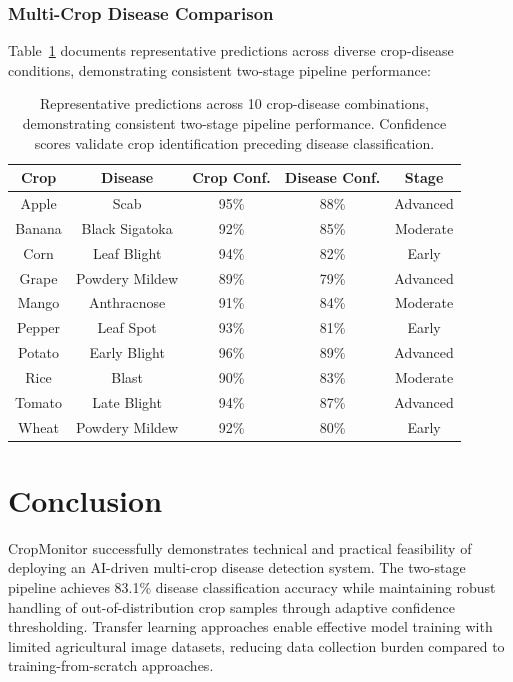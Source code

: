 \documentclass[conference]{IEEEtran}
\begin{document}
\subsubsection{Multi-Crop Disease Comparison}

Table~\ref{tab:visual_examples} documents representative predictions across diverse crop-disease conditions, demonstrating consistent two-stage pipeline performance:

\begin{table}[H]
\centering
\renewcommand{\arraystretch}{1.4}
\begin{tabular}{|c|c|c|c|c|}
\hline
\textbf{Crop} & \textbf{Disease} & \textbf{Crop Conf.} & \textbf{Disease Conf.} & \textbf{Stage} \\
\hline
Apple & Scab & 95\% & 88\% & Advanced \\
Banana & Black Sigatoka & 92\% & 85\% & Moderate \\
Corn & Leaf Blight & 94\% & 82\% & Early \\
Grape & Powdery Mildew & 89\% & 79\% & Advanced \\
Mango & Anthracnose & 91\% & 84\% & Moderate \\
Pepper & Leaf Spot & 93\% & 81\% & Early \\
Potato & Early Blight & 96\% & 89\% & Advanced \\
Rice & Blast & 90\% & 83\% & Moderate \\
Tomato & Late Blight & 94\% & 87\% & Advanced \\
Wheat & Powdery Mildew & 92\% & 80\% & Early \\
\hline
\end{tabular}
\caption{Representative predictions across 10 crop-disease combinations, demonstrating consistent two-stage pipeline performance. Confidence scores validate crop identification preceding disease classification.}
\label{tab:visual_examples}
\end{table}

\section{Conclusion}

CropMonitor successfully demonstrates technical and practical feasibility of deploying an AI-driven multi-crop disease detection system. The two-stage pipeline achieves 83.1\% disease classification accuracy while maintaining robust handling of out-of-distribution crop samples through adaptive confidence thresholding. Transfer learning approaches enable effective model training with limited agricultural image datasets, reducing data collection burden compared to training-from-scratch approaches.
\end{document}
